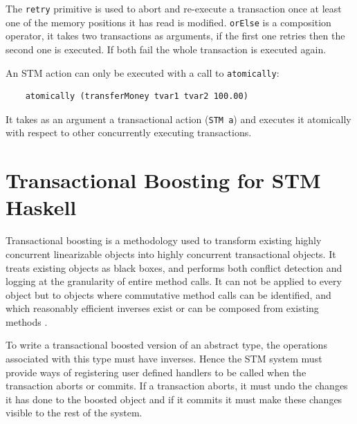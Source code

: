 \documentclass{llncs}
\begin{document}

The {\tt retry} primitive is used to abort and re-execute a transaction once at least one
of the memory positions it has read is modified. 
{\tt orElse} is a composition operator, it takes two transactions as arguments, if the first one retries then
the second one is executed. If both fail the whole transaction is executed again.

An STM action can only be executed with a call to {\tt atomically}:

{\small\begin{verbatim}
	atomically (transferMoney tvar1 tvar2 100.00)
\end{verbatim}}

It takes as an argument a transactional action ({\tt STM a}) and
executes it atomically with respect to other concurrently executing transactions.

\section {Transactional Boosting for STM Haskell}
\label{sec:boosting}


Transactional boosting is a methodology used to transform existing highly concurrent linearizable objects into
highly concurrent transactional objects. It treats existing objects as black boxes, and performs
both conflict detection and logging at the granularity of entire method calls. It can not
be applied to every object but to objects where commutative method calls can be identified, and which
reasonably efficient inverses exist or can be composed from existing methods \cite{tboosting}.

To write a transactional boosted version of an abstract type, the operations associated
with this type must have inverses. Hence the STM system must provide ways
of registering user defined handlers to be called when the transaction  aborts or
commits. If a transaction aborts, it must undo the changes it has done to the
boosted object and if it commits it must make these changes visible
to the rest of the system.
\end{document}
